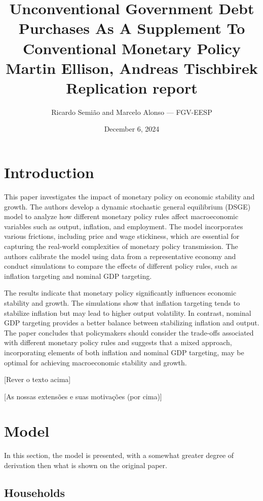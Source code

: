 \documentclass[12pt]{article}
\title{
    \textbf{Unconventional Government Debt Purchases As A Supplement To Conventional Monetary Policy}\\
    {\Large Martin Ellison, Andreas Tischbirek}\\
    Replication report
}
\author{Ricardo Semião and Marcelo Alonso --- FGV-EESP}
\date{December 6, 2024}
\begin{document}
\maketitle



\section{Introduction}

This paper investigates the impact of monetary policy on economic stability and growth. The authors develop a dynamic stochastic general equilibrium (DSGE) model to analyze how different monetary policy rules affect macroeconomic variables such as output, inflation, and employment. The model incorporates various frictions, including price and wage stickiness, which are essential for capturing the real-world complexities of monetary policy transmission. The authors calibrate the model using data from a representative economy and conduct simulations to compare the effects of different policy rules, such as inflation targeting and nominal GDP targeting.

The results indicate that monetary policy significantly influences economic stability and growth. The simulations show that inflation targeting tends to stabilize inflation but may lead to higher output volatility. In contrast, nominal GDP targeting provides a better balance between stabilizing inflation and output. The paper concludes that policymakers should consider the trade-offs associated with different monetary policy rules and suggests that a mixed approach, incorporating elements of both inflation and nominal GDP targeting, may be optimal for achieving macroeconomic stability and growth.

[Rever o texto acima]

[As nossas extensões e suas motivações (por cima)]



\section{Model}

In this section, the model is presented, with a somewhat greater degree of derivation then what is shown on the original paper.



\subsection{Households}
\end{document}
